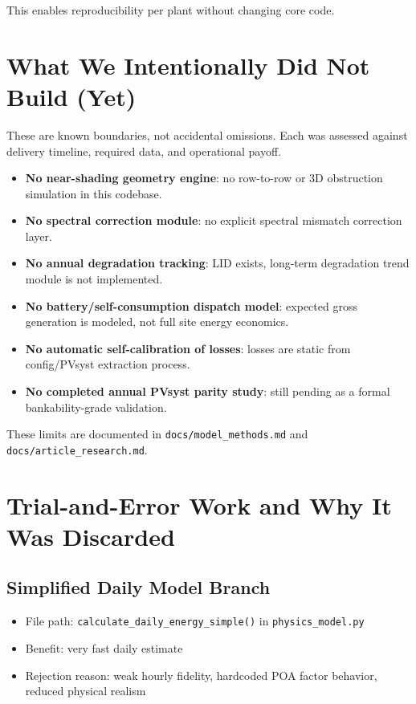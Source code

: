 \documentclass[11pt,a4paper]{article}
\newcommand{\artifact}[1]{\texttt{#1}}
\begin{document}
This enables reproducibility per plant without changing core code.

\section{What We Intentionally Did Not Build (Yet)}

\begin{scopebox}
These are known boundaries, not accidental omissions. Each was assessed against
delivery timeline, required data, and operational payoff.
\end{scopebox}

\begin{itemize}
  \item \textbf{No near-shading geometry engine}: no row-to-row or 3D obstruction simulation in this codebase.
  \item \textbf{No spectral correction module}: no explicit spectral mismatch correction layer.
  \item \textbf{No annual degradation tracking}: LID exists, long-term degradation trend module is not implemented.
  \item \textbf{No battery/self-consumption dispatch model}: expected gross generation is modeled, not full site energy economics.
  \item \textbf{No automatic self-calibration of losses}: losses are static from config/PVsyst extraction process.
  \item \textbf{No completed annual PVsyst parity study}: still pending as a formal bankability-grade validation.
\end{itemize}

These limits are documented in \artifact{docs/model\_methods.md} and \artifact{docs/article\_research.md}.

\section{Trial-and-Error Work and Why It Was Discarded}

\subsection{Simplified Daily Model Branch}
\begin{itemize}
  \item File path: \artifact{calculate\_daily\_energy\_simple()} in \artifact{physics\_model.py}
  \item Benefit: very fast daily estimate
  \item Rejection reason: weak hourly fidelity, hardcoded POA factor behavior, reduced physical realism
\end{itemize}
\end{document}

